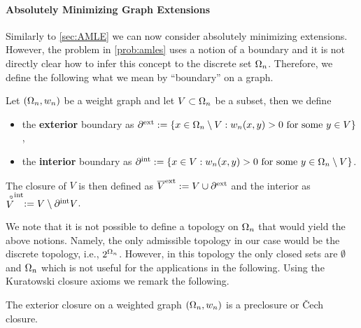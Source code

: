 \paragraph{Absolutely Minimizing Graph Extensions}
%
Similarly to \cref{sec:AMLE} we can now consider absolutely minimizing extensions. However, the problem in 
\cref{prob:amles} uses a notion of a boundary and it is not directly clear how to infer this concept to the discrete set $\Omega_n$. Therefore, we define the following what we mean by \enquote{boundary} on a graph.
%
\begin{definition}{}{}
Let $(\Omega_n, w_n)$ be a weight graph and let $V\subset\Omega_n$ be a subset, then we define
%
\begin{itemize}
\item the \textbf{exterior} boundary as $\partial^{\text{ext}} :=\{x\in \Omega_n\setminus V: w_n(x,y) > 0 \text{ for some } y\in V\}$,
\item the \textbf{interior} boundary as $\partial^{\text{int}} :=\{x\in V: w_n(x,y) > 0 \text{ for some } y\in \Omega_n\setminus V\}$.
\end{itemize}
%
The closure of $V$ is then defined as $\overline{V}^{\text{ext}} := V\cup \partial^{\text{ext}}$ and the interior as 
$\stackrel{\circ}{V}^{\text{int}}:= V\setminus \partial^{\text{int}} V$.
\end{definition}
%
%
\noindent%
We note that it is not possible to define a topology on $\Omega_n$ that would yield the above notions. Namely, the only admissible topology in our case would be the discrete topology, i.e., $2^{\Omega_n}$. However, in this topology the only closed sets are $\emptyset$ and $\Omega_n$ which is not useful for the applications in the following. Using the Kuratowski closure axioms \cite{kuratowski1922operation} we remark the following.
%
\begin{lemma}{}{}
The exterior closure on a weighted graph $(\Omega_n, w_n)$ is a preclosure or Čech closure.
\end{lemma}
%
